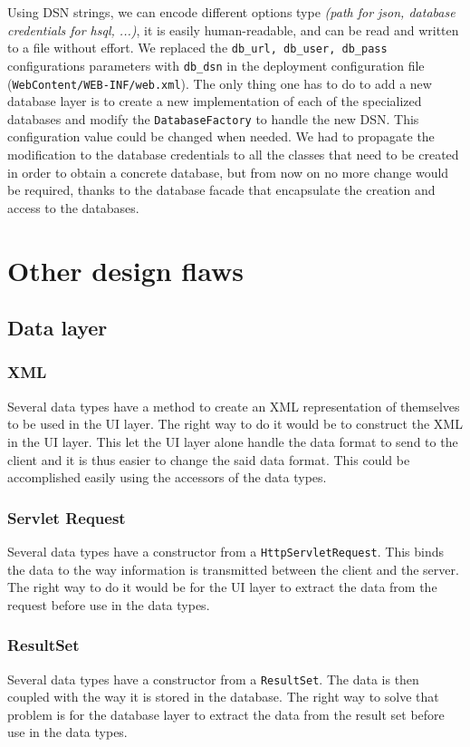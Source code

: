 Using DSN strings, we can encode different options type \textit{(path for json, database credentials for hsql, ...)}, it is easily human-readable, and can be read and written to a file without effort. We replaced the \texttt{db\_url, db\_user, db\_pass} configurations parameters with \texttt{db\_dsn} in the deployment configuration file (\texttt{WebContent/WEB-INF/web.xml}). The only thing one has to do to add a new database layer is to create a new implementation of each of the specialized databases and modify the \texttt{DatabaseFactory} to handle the new DSN. This configuration value could be changed when needed. We had to propagate the modification to the database credentials to all the classes that need to be created in order to obtain a concrete database, but from now on no more change would be required, thanks to the database facade that encapsulate the creation and access to the databases.


\section{Other design flaws}

\subsection{Data layer}

\subsubsection{XML}
Several data types have a method to create an XML representation of themselves to be used in the UI layer. The right way to do it would be to construct the XML in the UI layer. This let the UI layer alone handle the data format to send to the client and it is thus easier to change the said data format. This could be accomplished easily using the accessors of the data types.

\subsubsection{Servlet Request}
Several data types have a constructor from a \texttt{HttpServletRequest}. This binds the data to the way information is transmitted between the client and the server. The right way to do it would be for the UI layer to extract the data from the request before use in the data types.

\subsubsection{ResultSet}
Several data types have a constructor from a \texttt{ResultSet}. The data is then coupled with the way it is stored in the database. The right way to solve that problem is for the database layer to extract the data from the result set before use in the data types.

